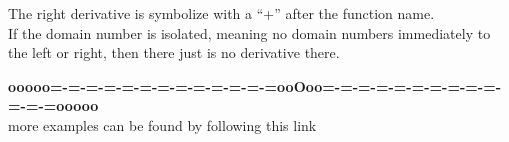 \documentclass{ximera}
\begin{document}
The right derivative is symbolize with a ``+'' after the function name. \\





If the domain number is isolated, meaning no domain numbers immediately to the left or right, then there just is no derivative there.




















\begin{center}
\textbf{\textcolor{green!50!black}{ooooo=-=-=-=-=-=-=-=-=-=-=-=-=ooOoo=-=-=-=-=-=-=-=-=-=-=-=-=ooooo}} \\

more examples can be found by following this link\\ 

\end{center}
\end{document}
